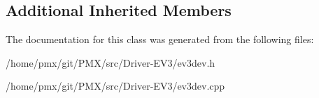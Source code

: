 \subsection*{Additional Inherited Members}


The documentation for this class was generated from the following files\+:\begin{DoxyCompactItemize}
\item 
/home/pmx/git/\+P\+M\+X/src/\+Driver-\/\+E\+V3/ev3dev.\+h\item 
/home/pmx/git/\+P\+M\+X/src/\+Driver-\/\+E\+V3/ev3dev.\+cpp\end{DoxyCompactItemize}
